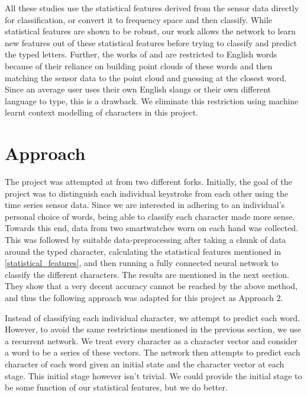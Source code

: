 \documentclass[10pt,twocolumn,letterpaper]{article}
\begin{document}
All these studies use the statistical features derived from the sensor data directly for classification, or convert it to frequency space and then classify. While statistical features are shown to be robust, our work allows the network to learn new features out of these statistical features before trying to classify and predict the typed letters. Further, the works of \cite{wang} and \cite{maiti} are restricted to English words because of their reliance on building point clouds of these words and then matching the sensor data to the point cloud and guessing at the closest word. Since an average user uses their own English slangs or their own different language to type, this is a drawback. We eliminate this restriction using machine learnt context modelling of characters in this project.

\section{Approach}
The project was attempted at from two different forks. Initially, the goal of the project was to distinguish each individual keystroke from each other using the time series sensor data. Since we are interested in adhering to an individual's personal choice of words, being able to classify each character made more sense. Towards this end, data from two smartwatches worn on each hand was collected. This was followed by suitable data-preprocessing after taking a chunk of data around the typed character, calculating the statistical features mentioned in \ref{statistical_features}, and then running a fully connected neural network to classify the different characters. The results are mentioned in the next section. They show that a very decent accuracy cannot be reached by the above method, and thus the following approach was adapted for this project as Approach 2.

Instead of classifying each individual character, we attempt to predict each word. However, to avoid the same restrictions mentioned in the previous section, we use a recurrent network. We treat every character as a character vector and consider a word to be a series of these vectors. The network then attempts to predict each character of each word given an initial state and the character vector at each stage. This initial stage however isn't trivial. We could provide the initial stage to be some function of our statistical features, but we do better.
\end{document}
